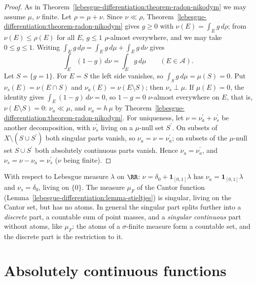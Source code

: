 \begin{proof}
As in Theorem~\ref{lebesgue-differentiation:theorem-radon-nikodym} we may assume $\mu$, $\nu$ finite. Let $\rho = \mu + \nu$. Since $\nu \ll \rho$, Theorem~\ref{lebesgue-differentiation:theorem-radon-nikodym} gives $g \geq 0$ with
$\nu(E) = \int_Eg\,d\rho$; from $\nu(E) \leq \rho(E)$ for all $E$, $g \leq 1$ $\rho$-almost everywhere, and we may take $0 \leq g \leq 1$. Writing $\int_Eg\,d\rho = \int_Eg\,d\mu + \int_Eg\,d\nu$ gives
\[
\int_E(1 - g)\,d\nu = \int_Eg\,d\mu \qquad (E \in \mathcal{A}).
\]
Let $S = \{g = 1\}$. For $E = S$ the left side vanishes, so $\int_Sg\,d\mu = \mu(S) = 0$. Put $\nu_s(E) = \nu(E \cap S)$ and $\nu_a(E) = \nu(E \setminus S)$; then $\nu_s \perp \mu$. If $\mu(E) = 0$, the identity gives
$\int_E(1 - g)\,d\nu = 0$, so $1 - g = 0$ $\nu$-almost everywhere on $E$, that is, $\nu(E \setminus S) = 0$: $\nu_a \ll \mu$, and $\nu_a = h\,\mu$ by Theorem~\ref{lebesgue-differentiation:theorem-radon-nikodym}. For
uniqueness, let $\nu = \nu_a^{\prime} + \nu_s^{\prime}$ be another decomposition, with $\nu_s^{\prime}$ living on a $\mu$-null set $S^{\prime}$. On subsets of $X \setminus (S \cup S^{\prime})$ both singular parts vanish,
so $\nu_a = \nu = \nu_a^{\prime}$; on subsets of the $\mu$-null set $S \cup S^{\prime}$ both absolutely continuous parts vanish. Hence $\nu_a = \nu_a^{\prime}$, and $\nu_s = \nu - \nu_a = \nu_s^{\prime}$ ($\nu$ being finite).
\end{proof}

\begin{example}\label{lebesgue-differentiation:example-lebesgue-decomposition}
With respect to Lebesgue measure $\lambda$ on $\RR$: $\nu = \delta_0 + \mathbf{1}_{[0,1]}\lambda$ has $\nu_a = \mathbf{1}_{[0,1]}\lambda$ and $\nu_s = \delta_0$, living on $\{0\}$. The measure $\mu_F$ of the
Cantor function (Lemma~\ref{lebesgue-differentiation:lemma-stieltjes}) is singular, living on the Cantor set, but has no atoms. In general the singular part splits further into a \emph{discrete} part, a countable sum of
point masses, and a \emph{singular continuous} part without atoms, like $\mu_F$: the atoms of a $\sigma$-finite measure form a countable set, and the discrete part is the restriction to it.
\end{example}

\section{Absolutely continuous functions}\label{lebesgue-differentiation:section-absolutely-continuous}

